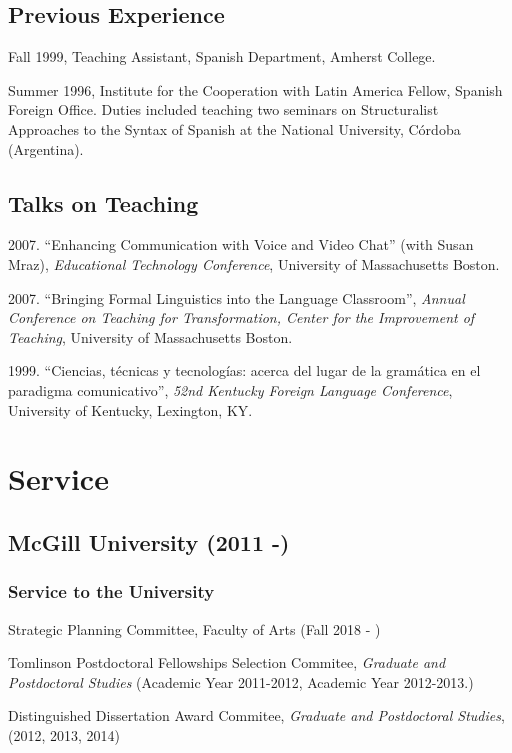 \documentclass[11pt]{article}
\begin{document}
\subsection*{\textbf{Previous Experience}}
Fall 1999, Teaching Assistant, Spanish Department, Amherst College.

Summer 1996,  Institute for the Cooperation with Latin America Fellow,  Spanish Foreign Office. Duties included teaching two seminars on Structuralist Approaches to the Syntax of Spanish at the National University, C\'ordoba (Argentina).


\subsection*{Talks on Teaching}


2007. ``Enhancing Communication with Voice and Video Chat'' (with Susan Mraz), \textit{Educational Technology Conference}, University of Massachusetts Boston.

2007. ``Bringing Formal Linguistics into the Language Classroom'', \textit{Annual Conference on Teaching for Transformation, Center for the Improvement of Teaching}, University of Massachusetts Boston.

1999. ``Ciencias, t\'ecnicas y tecnolog\'ias: acerca del lugar de la gram\'atica en el paradigma comunicativo'', \textit{52nd Kentucky Foreign Language Conference}, University of Kentucky, Lexington, KY.

\section*{Service}

\subsection*{McGill University (2011 -)}

\subsubsection*{Service to the University}

Strategic Planning Committee, Faculty of Arts (Fall 2018 - )

Tomlinson Postdoctoral Fellowships Selection Commitee, \textit{Graduate and
  Postdoctoral Studies} (Academic Year 2011-2012, Academic Year 2012-2013.)

Distinguished Dissertation Award Commitee, \textit{Graduate and
  Postdoctoral Studies}, (2012, 2013, 2014)
\end{document}
